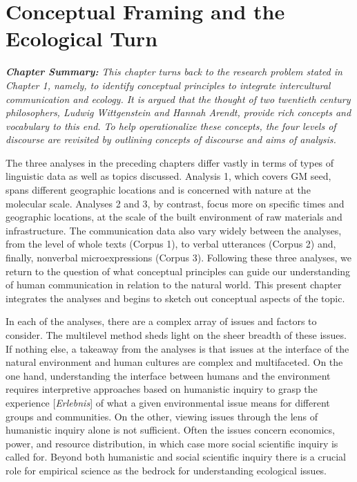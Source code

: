 \chapter{Conceptual Framing and the Ecological Turn}

\textit{\textbf{Chapter Summary:} This chapter turns back to the research problem stated in Chapter 1, namely, to identify conceptual principles to integrate intercultural communication and ecology. It is argued that the thought of two twentieth century philosophers, Ludwig Wittgenstein and Hannah Arendt, provide rich concepts and vocabulary to this end. To help operationalize these concepts, the four levels of discourse are revisited by outlining \textit{concepts of discourse} and \textit{aims of analysis}.}
\newline

The three analyses in the preceding chapters differ vastly in terms of types of linguistic data as well as topics discussed. Analysis 1, which covers GM seed, spans different geographic locations and is concerned with nature at the molecular scale. Analyses 2 and 3, by contrast, focus more on specific times and geographic locations, at the scale of the built environment of raw materials and infrastructure. The communication data also vary widely between the analyses, from the level of whole texts (Corpus 1), to verbal utterances (Corpus 2) and, finally, nonverbal microexpressions (Corpus 3). Following these three analyses, we return to the question of what conceptual principles can guide our understanding of human communication in relation to the natural world. This present chapter integrates the analyses and begins to sketch out conceptual aspects of the topic. 

In each of the analyses, there are a complex array of issues and factors to consider. The multilevel method sheds light on the sheer breadth of these issues. If nothing else, a takeaway from the analyses is that issues at the interface of the natural environment and human cultures are complex and multifaceted. On the one hand, understanding the interface between humans and the environment requires interpretive approaches based on humanistic inquiry to grasp the experience [\textit{Erlebnis}] of what a given environmental issue means for different groups and communities. On the other, viewing issues through the lens of humanistic inquiry alone is not sufficient. Often the issues concern economics, power, and resource distribution, in which case more social scientific inquiry is called for. Beyond both humanistic and social scientific inquiry there is a crucial role for empirical science as the bedrock for understanding ecological issues. 

